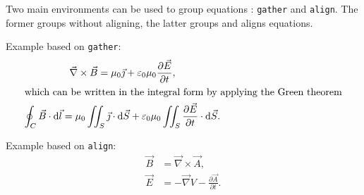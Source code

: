\documentclass[11pt, a4paper, english]{report}
\begin{document}
		Two main environments can be used to group equations : \texttt{gather} and \texttt{align}.
		The former groups without aligning, the latter groups and aligns equations.
		
		Example based on \texttt{gather}:
		\begin{gather}
			\vec{\nabla} \times \vec{B}
				= \mu_0 \vec{\jmath}
				+ \varepsilon_0 \mu_0 \frac{\partial \vec{E}}{\partial t}, \\
			\intertext{which can be written in the integral form by applying the Green theorem}
			\oint_{C} \vec{B} \cdot \mathrm{d} \vec{l}
				= \mu_0 \iint_S \vec{\jmath} \cdot \mathrm{d} \vec{S}
				+ \varepsilon_0 \mu_0 \iint_S \frac{\partial \vec{E}}{\partial t} \cdot \mathrm{d} \vec{S}.
		\end{gather}
		
		Example based on \texttt{align}:
		\begin{align}
			\vec{B} &= \vec{\nabla} \times \vec{A}, \\
			\vec{E} &= -\vec{\nabla} V - \frac{\partial \vec{A}}{\partial t}.
		\end{align}
%
\end{document}
